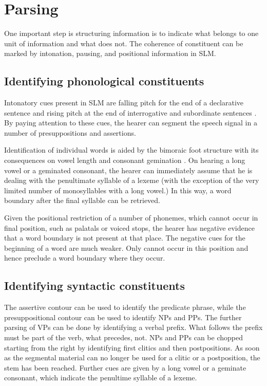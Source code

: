 \section{Parsing}\label{sec:disc:Parsing}
One important step is structuring information is to indicate what belongs to one unit of information and what does not. The coherence of constituent can be marked by intonation, pausing, and positional information in SLM.

\subsection{Identifying phonological constituents}\label{sec:disc:Identifyingphonologicalconstituents}
Intonatory cues present in SLM are falling pitch for the end of a declarative sentence and rising pitch at the end of interrogative and subordinate sentences . By paying attention to these cues, the hearer can segment the speech signal in a number of presuppositions and assertions.

Identification of individual words is aided by the bimoraic foot structure with its consequences on vowel length and consonant gemination . On hearing a long vowel or a geminated consonant, the hearer can immediately assume that he is dealing with the penultimate syllable of a lexeme (with the exception of the very limited number of monosyllables with a long vowel.) In this way, a word boundary after the final syllable can be retrieved.

Given the positional restriction of a number of phonemes, which cannot occur in final position, such as palatals or voiced stops, the hearer has negative evidence that a word boundary is not present at that place.  The negative cues for the beginning of a word are much weaker. Only   cannot occur in this position and hence preclude a word boundary where they occur.


\subsection{Identifying syntactic constituents}\label{sec:disc:Identifyingsyntacticconstituents}
The assertive contour  can be used to identify the predicate phrase, while the presuppositional contour  can be used to identify NPs and PPs. The further parsing of VPs can be done by identifying a verbal prefix. What follows the prefix must be part of the verb, what precedes, not. NPs and PPs can be chopped starting from the right by identifying first clitics and then postpositions. As soon as the segmental material can no longer be used for a clitic or a postposition, the stem has been reached. Further cues are given by a long vowel or a geminate consonant, which indicate the penultime syllable of a lexeme.


